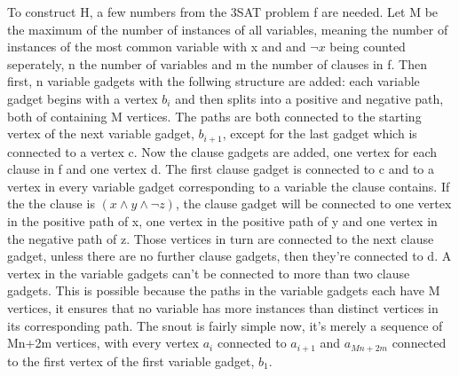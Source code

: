 \documentclass[12pt,a4paper]{article}
\begin{document}
To construct H, a few numbers from the 3SAT problem f are needed. Let M be the maximum of the  number of instances of all variables, meaning the number of instances of the most common variable with x and and $\neg x$ being counted seperately, n the number of variables and m the number of clauses in f. Then first, n variable gadgets with the follwing structure are added: each variable gadget begins with a vertex $b_i$ and then splits into a positive and negative path, both of containing M vertices. The paths are both connected to the starting vertex of the next variable gadget, $b_{i+1}$, except for the last gadget which is connected to a vertex c. Now the clause gadgets are added, one vertex for each clause in f and one vertex d. The first clause gadget is connected to c and to a vertex in every variable gadget corresponding to a variable the clause contains. If the the clause is $(x \wedge y \wedge \neg z)$, the clause gadget will be connected to one vertex in the positive path of x, one vertex in the positive path of y and one vertex in the negative path of z. Those vertices in turn are connected to the next clause gadget, unless there are no further clause gadgets, then they're connected to d. A vertex in the variable gadgets can't be connected to more than two clause gadgets. This is possible because the paths in the variable gadgets each have M vertices, it ensures that no variable has more instances than distinct vertices in its corresponding path. The snout is fairly simple now, it's merely a sequence of Mn+2m vertices, with every vertex $a_i$ connected to $a_{i+1}$ and $a_{Mn+2m}$ connected to the first  vertex of the first variable gadget, $b_1$. 
\newline
\end{document}
